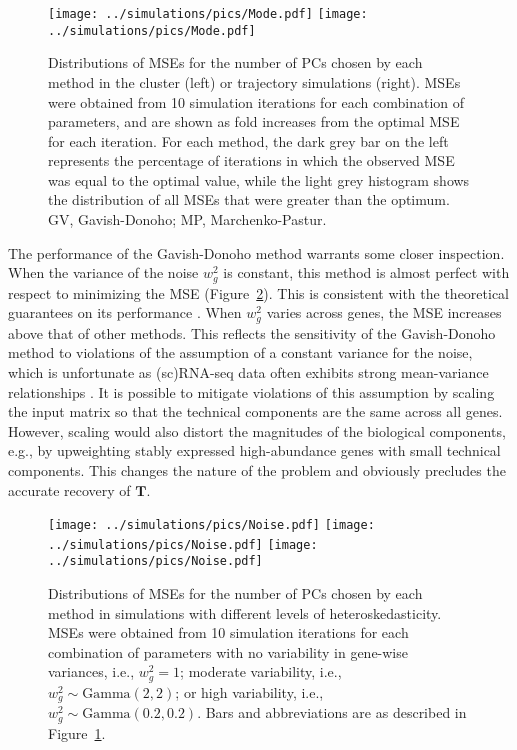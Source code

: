 \documentclass[10pt,letterpaper]{article}
\begin{document}
\begin{figure}
\begin{center}
    \texttt{[image: ../simulations/pics/Mode.pdf]}
    \texttt{[image: ../simulations/pics/Mode.pdf]}
\end{center}
\caption{Distributions of MSEs for the number of PCs chosen by each method in the cluster (left) or trajectory simulations (right).
MSEs were obtained from 10 simulation iterations for each combination of parameters, and are shown as fold increases from the optimal MSE for each iteration.
For each method, the dark grey bar on the left represents the percentage of iterations in which the observed MSE was equal to the optimal value,
while the light grey histogram shows the distribution of all MSEs that were greater than the optimum.
GV, Gavish-Donoho; MP, Marchenko-Pastur.}
\label{fig:all}
\end{figure}

The performance of the Gavish-Donoho method warrants some closer inspection.
When the variance of the noise $w^2_g$ is constant, this method is almost perfect with respect to minimizing the MSE (Figure~\ref{fig:noise}).
This is consistent with the theoretical guarantees on its performance \cite{gavish2014optimal}.
When $w^2_g$ varies across genes, the MSE increases above that of other methods.
This reflects the sensitivity of the Gavish-Donoho method to violations of the assumption of a constant variance for the noise,
which is unfortunate as (sc)RNA-seq data often exhibits strong mean-variance relationships \cite{lun2016stepbystep,law2014voom}. 
It is possible to mitigate violations of this assumption by scaling the input matrix so that the technical components are the same across all genes.
However, scaling would also distort the magnitudes of the biological components, e.g., by upweighting stably expressed high-abundance genes with small technical components.
This changes the nature of the problem and obviously precludes the accurate recovery of $\mathbf{T}$.

\begin{figure}
\begin{center}
    \texttt{[image: ../simulations/pics/Noise.pdf]}
    \texttt{[image: ../simulations/pics/Noise.pdf]}
    \texttt{[image: ../simulations/pics/Noise.pdf]}
\end{center}
\caption{Distributions of MSEs for the number of PCs chosen by each method in simulations with different levels of heteroskedasticity.
MSEs were obtained from 10 simulation iterations for each combination of parameters with 
no variability in gene-wise variances, i.e., $w_g^2=1$;
moderate variability, i.e., $w_g^2 \sim \mbox{Gamma}(2, 2)$;
or high variability, i.e., $w_g^2 \sim \mbox{Gamma}(0.2, 0.2)$.
Bars and abbreviations are as described in Figure~\ref{fig:all}.    
}
\label{fig:noise}
\end{figure}
\end{document}
